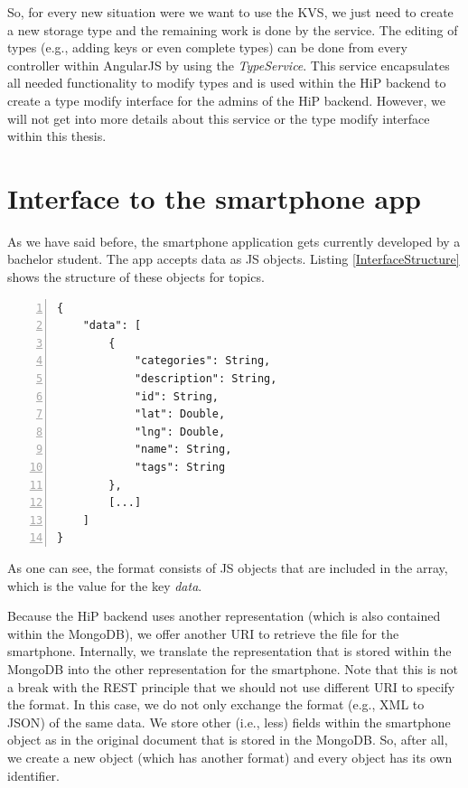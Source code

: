 So, for every new situation were we want to use the \ac{KVS}, we just need to create a new storage type and the remaining work is done by the service. The editing of types (e.g., adding keys or even complete types) can be done from every controller within AngularJS by using the \emph{TypeService}. This service encapsulates all needed functionality to modify types and is used within the \ac{HiP} backend to create a type modify interface for the admins of the \ac{HiP} backend. However, we will not get into more details about this service or the type modify interface within this thesis.

\section{Interface to the smartphone app}
As we have said before, the smartphone application gets currently developed by a bachelor student. The app accepts data as \ac{JS} objects. Listing \ref{InterfaceStructure} shows the structure of these objects for topics. 

\begin{lstlisting}[numbers=left,caption={The format of topic files within the smartphone application.},label=InterfaceStructure,frame=tlbr,breaklines]
{
    "data": [
        {
            "categories": String,
            "description": String,
            "id": String,
            "lat": Double,
            "lng": Double,
            "name": String,
            "tags": String
        },
        [...]
    ]
}
\end{lstlisting}

As one can see, the format consists of \ac{JS} objects that are included in the array, which is the value for the key \emph{data}.  

Because the \ac{HiP} backend uses another representation (which is also contained within the MongoDB), we offer another \ac{URI} to retrieve the file for the smartphone. Internally, we translate the representation that is stored within the MongoDB into the other representation for the smartphone. Note that this is not a break with the \ac{REST} principle that we should not use different \ac{URI} to specify the format. In this case, we do not only exchange the format (e.g., \ac{XML} to \ac{JSON}) of the same data. We store other (i.e., less) fields within the smartphone object as in the original document that is stored in the MongoDB. So, after all, we create a new object (which has another format) and every object has its own identifier. 

